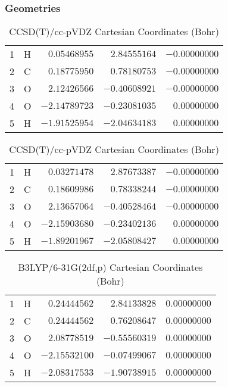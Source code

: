 \documentclass[10pt,oneside]{article}
\begin{document}
\begin{table}[h!]
\subsubsection*{Geometries}
\begin{multicols}{2}
\centering
\caption{CCSD(T)/cc-pVTZ Cartesian Coordinates (Bohr)}
\begin{tabular}{llrrr}
\toprule
1  & H  & $ 0.05468955$ & $ 2.84555164$ & $-0.00000000$ \\
2  & C  & $ 0.18775950$ & $ 0.78180753$ & $-0.00000000$ \\
3  & O  & $ 2.12426566$ & $-0.40608921$ & $-0.00000000$ \\
4  & O  & $-2.14789723$ & $-0.23081035$ & $ 0.00000000$ \\
5  & H  & $-1.91525954$ & $-2.04634183$ & $ 0.00000000$ \\
\bottomrule
\end{tabular}
\caption{CCSD(T)/cc-pVDZ Cartesian Coordinates (Bohr)}
\begin{tabular}{llrrr}
\toprule
1  & H  & $ 0.03271478$ & $ 2.87673387$ & $-0.00000000$ \\
2  & C  & $ 0.18609986$ & $ 0.78338244$ & $-0.00000000$ \\
3  & O  & $ 2.13657064$ & $-0.40528464$ & $-0.00000000$ \\
4  & O  & $-2.15903680$ & $-0.23402136$ & $ 0.00000000$ \\
5  & H  & $-1.89201967$ & $-2.05808427$ & $ 0.00000000$ \\
\bottomrule
\end{tabular}
\end{multicols}
\end{table}

\begin{table}[h]
\centering
\caption{B3LYP/6-31G(2df,p) Cartesian Coordinates (Bohr)}
\begin{tabular}{llrrr}
\toprule
1  & H  & $ 0.24444562$ & $ 2.84133828$ & $ 0.00000000$ \\
2  & C  & $ 0.24444562$ & $ 0.76208647$ & $ 0.00000000$ \\
3  & O  & $ 2.08778519$ & $-0.55560319$ & $ 0.00000000$ \\
4  & O  & $-2.15532100$ & $-0.07499067$ & $ 0.00000000$ \\
5  & H  & $-2.08317533$ & $-1.90738915$ & $ 0.00000000$ \\
\bottomrule
\end{tabular}
\end{table}
\end{document}
